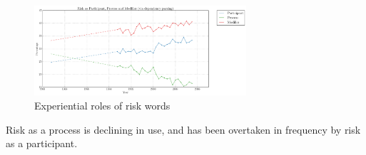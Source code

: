 



    \begin{figure}[htb!]
    \centering
    \includegraphics[width=0.7\textwidth]{../images/risk-as-participant-process-and-modifier-via-dependency-parsing.png}
    \caption{Experiential roles of risk words}
    \label{fig:funcrole}
    \end{figure}

    

    \vspace{5mm}\noindent\begin{tcolorbox}[colback=yellow!5,colframe=yellow!40!black,title=Summary: experiential function of risk words]
    \parbox{1\textwidth}{%
    Risk as a process is declining in use, and has been overtaken in frequency by risk as a participant.}
    \end{tcolorbox}
    \vspace{5mm}

